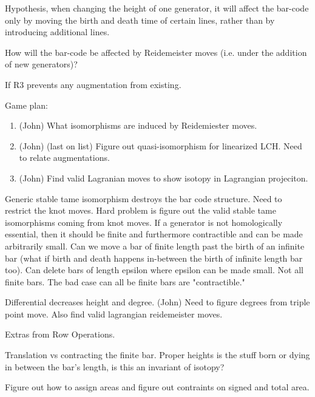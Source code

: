 \documentclass[General-Information/Most_recent_log(3_0).tex]{subfiles}
\begin{document}
\begin{question}
Hypothesis, when changing the height of one generator, it will affect the bar-code only by moving the birth and death time of certain lines, rather than by introducing additional lines.
\end{question}

\begin{question}
How will the bar-code be affected by Reidemeister moves (i.e. under the addition of new generators)?
\end{question}

If R3 prevents any augmentation from existing.

\begin{question}
    Game plan:
        \begin{enumerate}
            \item (John) What isomorphisms are induced by Reidemiester moves.
            \item (John) (last on list) Figure out quasi-isomorphism for linearized LCH. Need to relate augmentations.
            \item (John) Find valid Lagranian moves to show isotopy in Lagrangian projeciton.
        \end{enumerate}
\end{question}
Generic stable tame isomorphism destroys the bar code structure. Need to restrict the knot moves. Hard problem is figure out the valid stable tame isomorphisms coming from knot moves. If a generator is not homologically essential, then it should be finite and furthermore contractible and can be made arbitrarily small. Can we move a bar of finite length past the birth of an infinite bar (what if birth and death happens in-between the birth of infinite length bar too). Can delete bars of length epsilon where epsilon can be made small. Not all finite bars. The bad case can all be finite bars are "contractible."

Differential decreases height and degree. (John) Need to figure degrees from triple point move. Also find valid lagrangian reidemeister moves.

Extras from Row Operations.

Translation vs contracting the finite bar. Proper heights is the stuff born or dying in between the bar's length, is this an invariant of isotopy?


\begin{question}
    Figure out how to assign areas and figure out contraints on signed and total area.
\end{question}
\end{document}
